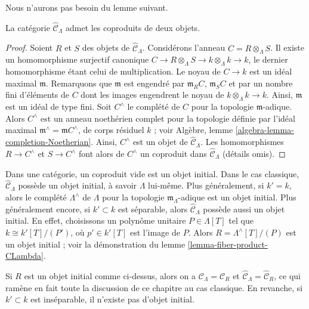 \noindent
Nous n'aurons pas besoin du lemme suivant.

\begin{lemma}
\label{lemma-CLambdahat-coproducts}
La catégorie $\widehat{\mathcal{C}}_\Lambda$ admet les coproduits de deux
objets.
\end{lemma}

\begin{proof}
Soient $R$ et $S$ des objets de $\widehat{\mathcal{C}}_\Lambda$.
Considérons l'anneau $C = R \otimes_\Lambda S$. Il existe un homomorphisme
surjectif canonique $C \to R \otimes_\Lambda S \to k \otimes_\Lambda k \to k$,
le dernier homomorphisme étant celui de multiplication. Le noyau de
$C \to k$ est un idéal maximal $\mathfrak m$. Remarquons que $\mathfrak m$
est engendré par $\mathfrak m_R C$, $\mathfrak m_S C$ et par un nombre fini
d'éléments de $C$ dont les images engendrent le noyau de
$k \otimes_\Lambda k \to k$. Ainsi, $\mathfrak m$ est un idéal de type fini.
Soit $C^\wedge$ le complété de $C$ pour la topologie $\mathfrak m$-adique.
Alors $C^\wedge$ est un anneau noethérien complet pour la topologie définie
par l'idéal maximal $\mathfrak m^\wedge = \mathfrak mC^\wedge$, de corps
résiduel $k$ ; voir Algèbre, lemme
\ref{algebra-lemma-completion-Noetherian}. Ainsi, $C^\wedge$ est un objet de
$\widehat{\mathcal{C}}_\Lambda$. Les homomorphismes $R \to C^\wedge$ et
$S \to C^\wedge$ font alors de $C^\wedge$ un coproduit dans
$\widehat{\mathcal{C}}_\Lambda$ (détails omis).
\end{proof}

\noindent
Dans une catégorie, un coproduit vide est un objet initial. Dans le cas
classique, $\widehat{\mathcal{C}}_\Lambda$ possède un objet initial, à savoir
$\Lambda$ lui-même. Plus généralement, si $k' = k$, alors le complété
$\Lambda^\wedge$ de $\Lambda$ pour la topologie $\mathfrak m_\Lambda$-adique
est un objet initial. Plus généralement encore, si $k' \subset k$ est
séparable, alors $\widehat{\mathcal{C}}_\Lambda$ possède aussi un objet
initial. En effet, choisissons un polynôme unitaire $P \in \Lambda[T]$ tel que
$k \cong k'[T]/(P')$, où $p' \in k'[T]$ est l'image de $P$. Alors
$R = \Lambda^\wedge[T]/(P)$ est un objet initial ; voir la démonstration du
lemme \ref{lemma-fiber-product-CLambda}.

\medskip\noindent
Si $R$ est un objet initial comme ci-dessus, alors on a
$\mathcal{C}_\Lambda = \mathcal{C}_R$ et
$\widehat{\mathcal{C}}_\Lambda = \widehat{\mathcal{C}}_R$, ce qui ramène en
fait toute la discussion de ce chapitre au cas classique. En revanche, si
$k' \subset k$ est inséparable, il n'existe pas d'objet initial.

